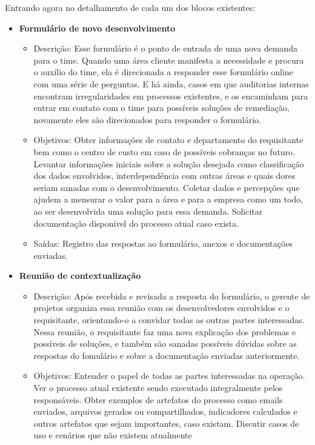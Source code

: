 	Entrando agora no detalhamento de cada um dos blocos existentes:
	\begin{itemize}
		\item \textbf{Formulário de novo desenvolvimento}
		\begin{itemize}
			\item Descrição: Esse formulário é o ponto de entrada de uma nova demanda para o time. Quando uma área
			cliente manifesta a necessidade e procura o auxílio do time, ela é direcionada a responder esse formulário
			online com uma série de perguntas. E há ainda, casos em que auditorias internas encontram irregularidades em processos existentes,
			e os encaminham para entrar em contato com o time para possíveis soluções de remediação, novamente eles são direcionados para responder o formulário.
			\item Objetivos: Obter informações de contato e departamento do requisitante bem como o centro de custo em caso de
			possíveis cobranças no futuro. Levantar informações iniciais sobre a solução desejada como classificação dos dados envolvidos, 
			interdependência com outras áreas e quais dores seriam sanadas com o desenvolvimento.
			Coletar dados e percepções que ajudem a mensurar o valor para a área e para a empresa como um todo, ao ser desenvolvida uma
			solução para essa demanda. Solicitar documentação disponível do processo atual caso exista.
			\item Saídas: Registro das respostas ao formulário, anexos e documentações enviadas.
		\end{itemize}
		\item \textbf{Reunião de contextualização}
		\begin{itemize}
			\item Descrição: Após recebida e revisada a resposta do formulário, o gerente de projetos organiza essa reunião com os desenvolvedores
			envolvidos e o requisitante, orientando-o a convidar todas as outras partes interessadas. Nessa reunião, o requisitante faz uma nova explicação dos problemas e possíveis
			de soluções, e também são sanadas possíveis dúvidas sobre as respostas do fomulário e sobre a documentação enviadas anteriormente.
			\item Objetivos: Entender o papel de todas as partes interessadas na operação. Ver o processo atual existente sendo executado integralmente
			pelos responsáveis. Obter exemplos de artefatos do processo como emails enviados, arquivos gerados ou compartilhados,
			indicadores calculados e outros artefatos que sejam importantes, caso existam. Discutir casos de uso e cenários que não existem atualmente

\end{itemize}
\end{itemize}
